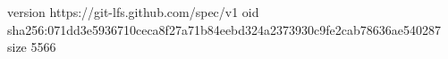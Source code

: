 version https://git-lfs.github.com/spec/v1
oid sha256:071dd3e5936710ceca8f27a71b84eebd324a2373930c9fe2cab78636ae540287
size 5566
